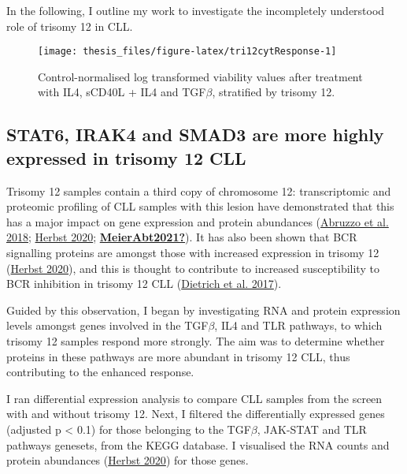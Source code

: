 \documentclass[11pt, a4paper, twosided]{book}
\begin{document}
In the following, I outline my work to investigate the incompletely understood role of trisomy 12 in CLL.


\begin{figure}

{\centering \texttt{[image: thesis\_files/figure-latex/tri12cytResponse-1]} 

}

\caption{Control-normalised log transformed viability values after treatment with IL4, sCD40L + IL4 and TGF\(\beta\), stratified by trisomy 12.}\label{fig:tri12cytResponse}
\end{figure}
\hypertarget{gene-dosage-effects}{%
\subsection{STAT6, IRAK4 and SMAD3 are more highly expressed in trisomy 12 CLL}\label{gene-dosage-effects}}

Trisomy 12 samples contain a third copy of chromosome 12: transcriptomic and proteomic profiling of CLL samples with this lesion have demonstrated that this has a major impact on gene expression and protein abundances (\protect\hyperlink{ref-Abruzzo2018}{Abruzzo et al. 2018}; \protect\hyperlink{ref-HerbstThesis}{Herbst 2020}; \protect\hyperlink{ref-MeierAbt2021}{\textbf{MeierAbt2021?}}). It has also been shown that BCR signalling proteins are amongst those with increased expression in trisomy 12 (\protect\hyperlink{ref-HerbstThesis}{Herbst 2020}), and this is thought to contribute to increased susceptibility to BCR inhibition in trisomy 12 CLL (\protect\hyperlink{ref-JCIpaper}{Dietrich et al. 2017}).

Guided by this observation, I began by investigating RNA and protein expression levels amongst genes involved in the TGF\(\beta\), IL4 and TLR pathways, to which trisomy 12 samples respond more strongly. The aim was to determine whether proteins in these pathways are more abundant in trisomy 12 CLL, thus contributing to the enhanced response.

I ran differential expression analysis to compare CLL samples from the screen with and without trisomy 12. Next, I filtered the differentially expressed genes (adjusted p \textless{} 0.1) for those belonging to the TGF\(\beta\), JAK-STAT and TLR pathways genesets, from the KEGG database. I visualised the RNA counts and protein abundances (\protect\hyperlink{ref-HerbstThesis}{Herbst 2020}) for those genes.
\end{document}
